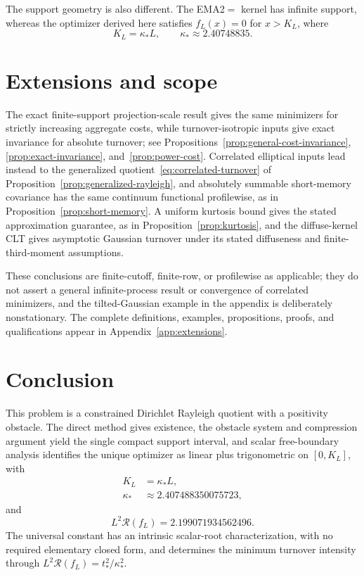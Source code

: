 \documentclass[11pt]{amsart}
\theoremstyle{definition}
\theoremstyle{remark}
\newcommand{\Rcal}{\mathcal R}
\begin{document}
The support geometry is also different. The EMA2$=$ kernel has infinite support,
whereas the optimizer derived here satisfies $f_L(x)=0$ for $x>K_L$, where
\[
 K_L=\kappa_*L,\qquad \kappa_*\approx2.40748835.
\]

\section{Extensions and scope}\label{sec:extensions}
The exact finite-support projection-scale result gives the same minimizers for
strictly increasing aggregate costs, while turnover-isotropic inputs give exact
invariance for absolute turnover; see Propositions~\ref{prop:general-cost-invariance},
\ref{prop:exact-invariance}, and~\ref{prop:power-cost}. Correlated elliptical inputs lead instead to
the generalized quotient~\eqref{eq:correlated-turnover} of
Proposition~\ref{prop:generalized-rayleigh}, and absolutely summable
short-memory covariance has the same continuum functional profilewise, as in
Proposition~\ref{prop:short-memory}. A uniform kurtosis bound gives the stated
approximation guarantee, as in Proposition~\ref{prop:kurtosis}, and the diffuse-kernel CLT gives asymptotic Gaussian
turnover under its stated diffuseness and finite-third-moment assumptions.

These conclusions are finite-cutoff, finite-row, or profilewise as applicable;
they do not assert a general infinite-process result or convergence of
correlated minimizers, and the tilted-Gaussian example in the appendix is
deliberately nonstationary. The complete
definitions, examples, propositions, proofs, and qualifications appear in
Appendix~\ref{app:extensions}.

\section{Conclusion}
This problem is a constrained Dirichlet Rayleigh quotient with a positivity
obstacle. The direct method gives existence, the obstacle system and compression
argument yield the single compact support interval, and scalar free-boundary
analysis identifies the unique optimizer as linear plus trigonometric on
$[0,K_L]$, with
\[
 \begin{aligned}
 K_L&=\kappa_*L,\\
 \kappa_*&\approx2.407488350075723,
 \end{aligned}
\]
and
\[
 L^2\Rcal(f_L)=2.199071934562496.
\]
The universal constant has an intrinsic scalar-root characterization, with no
required elementary closed form, and determines the minimum turnover intensity
through $L^2\Rcal(f_L)=t_*^2/\kappa_*^2$.
\end{document}
